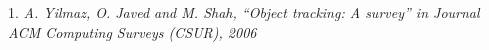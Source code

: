 \begin{frame}
\begin{columns}[t]
		\vspace{0.5cm}
		
		{
		}
	\end{columns}
	
	\vspace{0.5cm}
	
	\begin{columns}
		
		{
			\vspace{0.2cm}
		}
		
		{
			\tiny 1. \emph{A. Yilmaz, O. Javed and M. Shah, ``Object tracking: A survey'' in Journal ACM Computing Surveys (CSUR), 2006}
		}
	\end{columns}
	
\end{frame}

